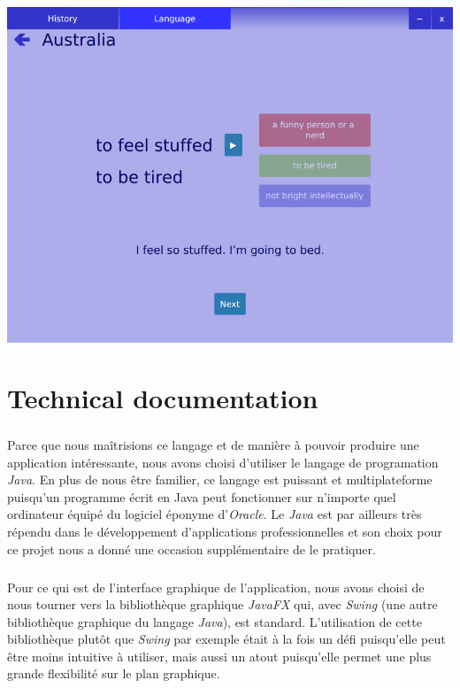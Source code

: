 \documentclass[11pt, a4paper]{report}
\begin{document}
\vspace{0.3cm}
\centerline{\includegraphics[scale=0.5]{images/AustraliaWrongAnswer.png}}



\chapter*{Technical documentation}
\paragraph{}Parce que nous maîtrisions ce langage et de manière à pouvoir produire une application intéressante, nous avons choisi d'utiliser le langage de programation \textit{Java}. En plus de nous être familier, ce langage est puissant et multiplateforme puisqu'un programme écrit en Java peut fonctionner sur n'importe quel ordinateur équipé du logiciel éponyme d'\textit{Oracle}. Le \textit{Java} est par ailleurs très répendu dans le développement d'applications professionnelles et son choix pour ce projet nous a donné une occasion supplémentaire de le pratiquer.

\paragraph{}Pour ce qui est de l'interface graphique de l'application, nous avons choisi de nous tourner vers la bibliothèque graphique \textit{JavaFX} qui, avec \textit{Swing} (une autre bibliothèque graphique du langage \textit{Java}), est standard. L'utilisation de cette bibliothèque plutôt que \textit{Swing} par exemple était à la fois un défi puisqu'elle peut être moins intuitive à utiliser, mais aussi un atout puisqu'elle permet une plus grande flexibilité sur le plan graphique.
\end{document}
